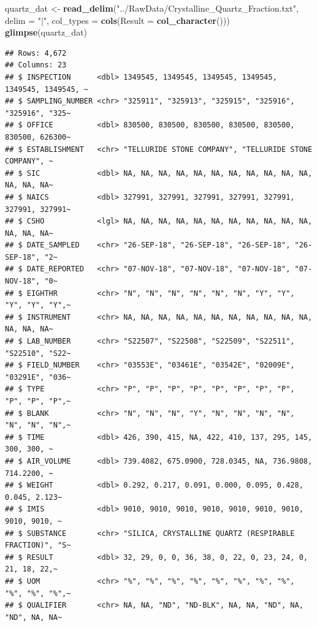 \documentclass[
]{article}
\newenvironment{Shaded}{\begin{snugshade}}{\end{snugshade}}
\newcommand{\AttributeTok}[1]{\textcolor[rgb]{0.13,0.29,0.53}{#1}}
\newcommand{\FunctionTok}[1]{\textcolor[rgb]{0.13,0.29,0.53}{\textbf{#1}}}
\newcommand{\NormalTok}[1]{#1}
\newcommand{\OtherTok}[1]{\textcolor[rgb]{0.56,0.35,0.01}{#1}}
\newcommand{\StringTok}[1]{\textcolor[rgb]{0.31,0.60,0.02}{#1}}
\begin{document}
\begin{Shaded}
\begin{Highlighting}[]
\NormalTok{quartz\_dat }\OtherTok{\textless{}{-}} \FunctionTok{read\_delim}\NormalTok{(}\StringTok{"../RawData/Crystalline\_Quartz\_Fraction.txt"}\NormalTok{, }\AttributeTok{delim =} \StringTok{"|"}\NormalTok{,}
           \AttributeTok{col\_types =} \FunctionTok{cols}\NormalTok{(}\AttributeTok{Result =} \FunctionTok{col\_character}\NormalTok{()))}
\FunctionTok{glimpse}\NormalTok{(quartz\_dat)}
\end{Highlighting}
\end{Shaded}

\begin{verbatim}
## Rows: 4,672
## Columns: 23
## $ INSPECTION      <dbl> 1349545, 1349545, 1349545, 1349545, 1349545, 1349545, ~
## $ SAMPLING_NUMBER <chr> "325911", "325913", "325915", "325916", "325916", "325~
## $ OFFICE          <dbl> 830500, 830500, 830500, 830500, 830500, 830500, 626300~
## $ ESTABLISHMENT   <chr> "TELLURIDE STONE COMPANY", "TELLURIDE STONE COMPANY", ~
## $ SIC             <dbl> NA, NA, NA, NA, NA, NA, NA, NA, NA, NA, NA, NA, NA, NA~
## $ NAICS           <dbl> 327991, 327991, 327991, 327991, 327991, 327991, 327991~
## $ CSHO            <lgl> NA, NA, NA, NA, NA, NA, NA, NA, NA, NA, NA, NA, NA, NA~
## $ DATE_SAMPLED    <chr> "26-SEP-18", "26-SEP-18", "26-SEP-18", "26-SEP-18", "2~
## $ DATE_REPORTED   <chr> "07-NOV-18", "07-NOV-18", "07-NOV-18", "07-NOV-18", "0~
## $ EIGHTHR         <chr> "N", "N", "N", "N", "N", "N", "Y", "Y", "Y", "Y", "Y",~
## $ INSTRUMENT      <chr> NA, NA, NA, NA, NA, NA, NA, NA, NA, NA, NA, NA, NA, NA~
## $ LAB_NUMBER      <chr> "S22507", "S22508", "S22509", "S22511", "S22510", "S22~
## $ FIELD_NUMBER    <chr> "03553E", "03461E", "03542E", "02009E", "03291E", "036~
## $ TYPE            <chr> "P", "P", "P", "P", "P", "P", "P", "P", "P", "P", "P",~
## $ BLANK           <chr> "N", "N", "N", "Y", "N", "N", "N", "N", "N", "N", "N",~
## $ TIME            <dbl> 426, 390, 415, NA, 422, 410, 137, 295, 145, 300, 300, ~
## $ AIR_VOLUME      <dbl> 739.4082, 675.0900, 728.0345, NA, 736.9808, 714.2200, ~
## $ WEIGHT          <dbl> 0.292, 0.217, 0.091, 0.000, 0.095, 0.428, 0.045, 2.123~
## $ IMIS            <dbl> 9010, 9010, 9010, 9010, 9010, 9010, 9010, 9010, 9010, ~
## $ SUBSTANCE       <chr> "SILICA, CRYSTALLINE QUARTZ (RESPIRABLE FRACTION)", "S~
## $ RESULT          <dbl> 32, 29, 0, 0, 36, 38, 0, 22, 0, 23, 24, 0, 21, 18, 22,~
## $ UOM             <chr> "%", "%", "%", "%", "%", "%", "%", "%", "%", "%", "%",~
## $ QUALIFIER       <chr> NA, NA, "ND", "ND-BLK", NA, NA, "ND", NA, "ND", NA, NA~
\end{verbatim}
\end{document}
